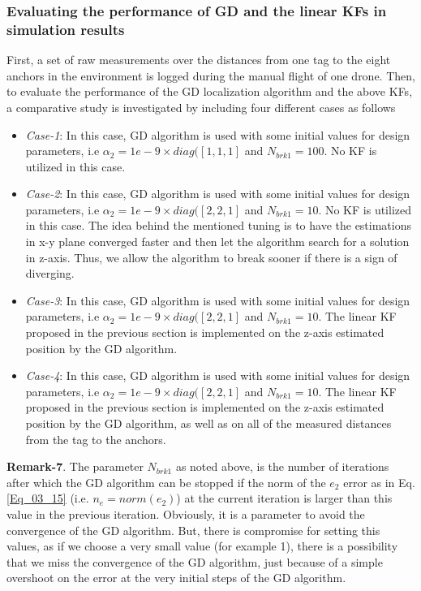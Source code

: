 \documentclass{article}
\begin{document}
\subsubsection{Evaluating the performance of GD and the linear KFs in simulation results}
First, a set of raw measurements over the distances from one tag to the eight anchors in the environment is logged during the manual flight of one drone.
Then, to evaluate the performance of the GD localization algorithm and the above KFs, a comparative study is investigated by including four different cases as follows
\begin{itemize}
    \item \textit{Case-1}: In this case, GD algorithm is used with some initial values for design parameters, i.e $\alpha_2 = 1e-9 \times diag([1,1,1]$ and $N_{brk1} = 100$. No KF is utilized in this case.
    \item \textit{Case-2}: In this case, GD algorithm is used with some initial values for design parameters, i.e $\alpha_2 = 1e-9 \times diag([2,2,1]$ and $N_{brk1} = 10$. No KF is utilized in this case. The idea behind the mentioned tuning is to have the estimations in x-y plane converged faster and then let the algorithm search for a solution in z-axis. Thus, we allow the algorithm to break sooner if there is a sign of diverging.
    \item \textit{Case-3}: In this case, GD algorithm is used with some initial values for design parameters, i.e $\alpha_2 = 1e-9 \times diag([2,2,1]$ and $N_{brk1} = 10$. The linear KF proposed in the previous section is implemented on the z-axis estimated position by the GD algorithm.
    \item \textit{Case-4}: In this case, GD algorithm is used with some initial values for design parameters, i.e $\alpha_2 = 1e-9 \times diag([2,2,1]$ and $N_{brk1} = 10$. The linear KF proposed in the previous section is implemented on the z-axis estimated position by the GD algorithm, as well as on all of the measured distances from the tag to the anchors.
\end{itemize}

\textbf{Remark-7}. The parameter $N_{brk1}$ as noted above, is the number of iterations after which the GD algorithm can be stopped if the norm of the $e_2$ error as in Eq. \ref{Eq_03_15} (i.e. $n_e = norm(e_2)$) at the current iteration is larger than this value in the previous iteration.
Obviously, it is a parameter to avoid the convergence of the GD algorithm.
But, there is compromise for setting this values, as if we choose a very small value (for example 1), there is a possibility that we miss the convergence of the GD algorithm, just because of a simple overshoot on the error at the very initial steps of the GD algorithm.\\
\end{document}
